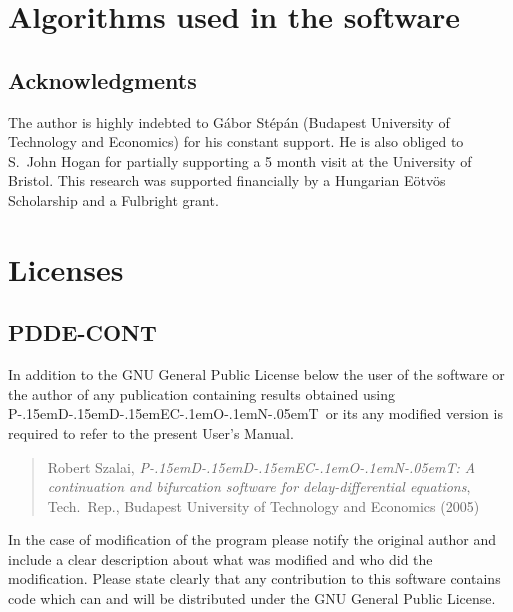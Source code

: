 \documentclass[10pt,a4paper]{ddedoc}
\def\pdde{{P\kern-.15emD\kern-.15emD\kern-.15emE\raisebox{.25ex}{-}C\kern-.1emO\kern-.1emN\kern-.05emT}}
\begin{document}
\section{Algorithms used in the software}


\subsection*{Acknowledgments}

The author is highly indebted to G\'abor St\'ep\'an (Budapest University of 
Technology and Economics) for his constant support. He is also
obliged to S.~John Hogan for partially supporting a 5 month visit at the University of Bristol.
This research was supported financially by a Hungarian E\"otv\"os Scholarship and a Fulbright grant.

\appendix

\section{Licenses}

\subsection{PDDE-CONT}

In addition to the GNU General Public License below the user of the software or the author of any
publication containing results obtained using \pdde\ or its any modified version is 
required to refer to the present User's Manual.
\begin{quote}
Robert Szalai, \emph{\pdde : A continuation and bifurcation software for 
delay-differential equations}, Tech.\ Rep., Budapest University of Technology and Economics (2005)
\end{quote}
In the case of modification of the program please notify the original author and include a clear description about what was modified and who did the 
modification. Please state clearly that any contribution to this software contains code which can and will be distributed under the GNU General Public License.
\end{document}
